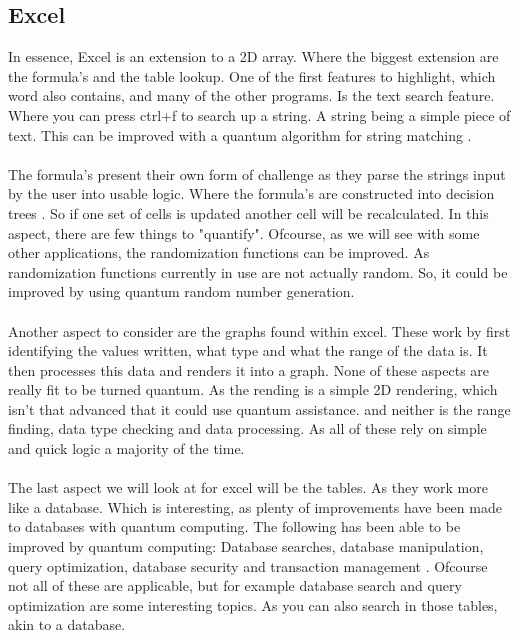 \subsection{Excel}
In essence, Excel is an extension to a 2D array. Where the biggest extension are the formula's and the table lookup. One of the first features to highlight, which word also contains, and many of the other programs. Is the text search feature. Where you can press ctrl+f to search up a string. A string being a simple piece of text. This can be improved with a quantum algorithm for string matching \cite{QuantumStringMatching}.
\\\\
The formula's present their own form of challenge as they parse the strings input by the user into usable logic. Where the formula's are constructed into decision trees \cite{ExcelForum}. So if one set of cells is updated another cell will be recalculated. In this aspect, there are few things to "quantify". Ofcourse, as we will see with some other applications, the randomization functions can be improved. As randomization functions currently in use are not actually random. So, it could be improved by using quantum random number generation.
\\\\
Another aspect to consider are the graphs found within excel. These work by first identifying the values written, what type and what the range of the data is. It then processes this data and renders it into a graph. None of these aspects are really fit to be turned quantum. As the rending is a simple 2D rendering, which isn't that advanced that it could use quantum assistance. and neither is the range finding, data type checking and data processing. As all of these rely on simple and quick logic a majority of the time.
\\\\
The last aspect we will look at for excel will be the tables. As they work more like a database. Which is interesting, as plenty of improvements have been made to databases with quantum computing. The following has been able to be improved by quantum computing: Database searches, database manipulation, query optimization, database security and transaction management \cite{quantumDB}. Ofcourse not all of these are applicable, but for example database search and query optimization are some interesting topics. As you can also search in those tables, akin to a database.
\newpage
